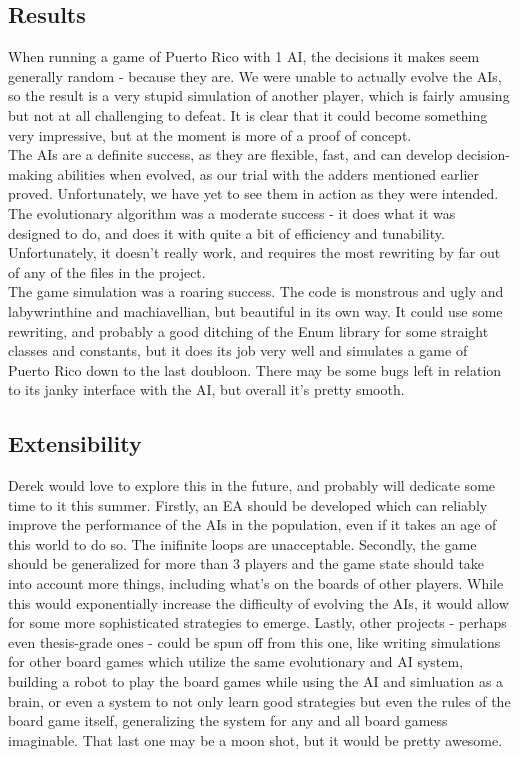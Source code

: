 \subsection{Results}

When running a game of Puerto Rico with 1 AI, the decisions it makes seem generally random - because they are.  We were unable to actually evolve the AIs, so the result is a very stupid simulation of another player, which is fairly amusing but not at all challenging to defeat.  It is clear that it could become something very impressive, but at the moment is more of a proof of concept. \\

The AIs are a definite success, as they are flexible, fast, and can develop decision-making abilities when evolved, as our trial with the adders mentioned earlier proved.  Unfortunately, we have yet to see them in action as they were intended. \\

The evolutionary algorithm was a moderate success - it does what it was designed to do, and does it with quite a bit of efficiency and tunability.  Unfortunately, it doesn't really work, and requires the most rewriting by far out of any of the files in the project. \\

The game simulation was a roaring success.  The code is monstrous and ugly and labywrinthine and machiavellian, but beautiful in its own way.  It could use some rewriting, and probably a good ditching of the Enum library for some straight classes and constants, but it does its job very well and simulates a game of Puerto Rico down to the last doubloon.  There may be some bugs left in relation to its janky interface with the AI, but overall it's pretty smooth.

\subsection{Extensibility}

Derek would love to explore this in the future, and probably will dedicate some time to it this summer.  Firstly, an EA should be developed which can reliably improve the performance of the AIs in the population, even if it takes an age of this world to do so.  The inifinite loops are unacceptable.  Secondly, the game should be generalized for more than 3 players and the game state should take into account more things, including what's on the boards of other players.  While this would exponentially increase the difficulty of evolving the AIs, it would allow for some more sophisticated strategies to emerge.  Lastly, other projects - perhaps even thesis-grade ones - could be spun off from this one, like writing simulations for other board games which utilize the same evolutionary and AI system, building a robot to play the board games while using the AI and simluation as a brain, or even a system to not only learn good strategies but even the rules of the board game itself, generalizing the system for any and all board gamess imaginable.  That last one may be a moon shot, but it would be pretty awesome.

